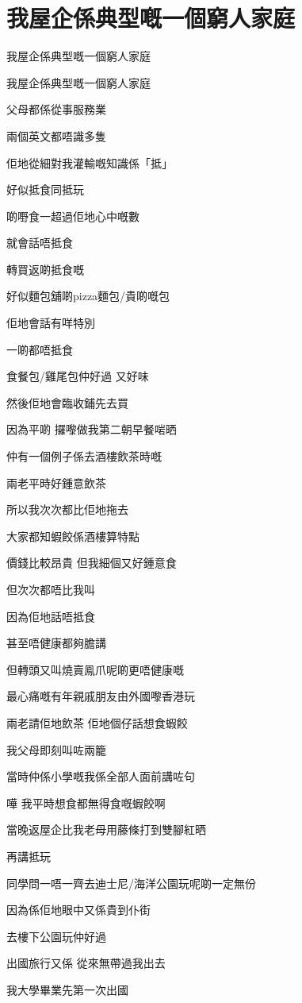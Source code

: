 \chapter{我屋企係典型嘅一個窮人家庭}

我屋企係典型嘅一個窮人家庭

我屋企係典型嘅一個窮人家庭

父母都係從事服務業

兩個英文都唔識多隻

佢地從細對我灌輸嘅知識係「抵」

好似抵食同抵玩

啲嘢食一超過佢地心中嘅數

就會話唔抵食

轉買返啲抵食嘅

好似麵包舖啲pizza麵包/貴啲嘅包

佢地會話有咩特別

一啲都唔抵食

食餐包/雞尾包仲好過 又好味

然後佢地會臨收鋪先去買

因為平啲 攞嚟做我第二朝早餐啱晒

仲有一個例子係去酒樓飲茶時嘅

兩老平時好鍾意飲茶

所以我次次都比佢地拖去

大家都知蝦餃係酒樓算特點

價錢比較昂貴 但我細個又好鍾意食

但次次都唔比我叫

因為佢地話唔抵食

甚至唔健康都夠膽講

但轉頭又叫燒賣鳯爪呢啲更唔健康嘅

最心痛嘅有年親戚朋友由外國嚟香港玩

兩老請佢地飲茶 佢地個仔話想食蝦餃

我父母即刻叫咗兩籠

當時仲係小學嘅我係全部人面前講咗句

嘩 我平時想食都無得食嘅蝦餃啊

當晚返屋企比我老母用藤條打到雙腳紅晒

再講抵玩

同學問一唔一齊去迪士尼/海洋公園玩呢啲一定無份

因為係佢地眼中又係貴到仆街

去樓下公園玩仲好過

出國旅行又係 從來無帶過我出去

我大學畢業先第一次出國

